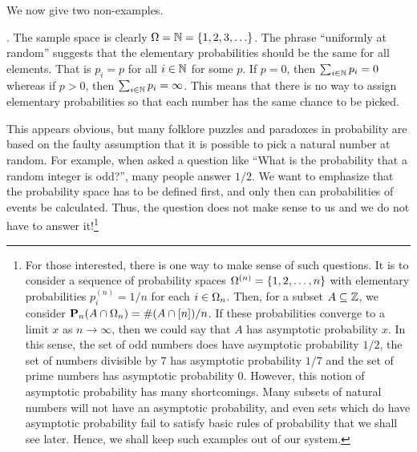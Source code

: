 \documentclass[preprint,  11pt]{amsart}
\begin{document}
We now give two non-examples.
\begin{example}. The sample space is clearly $\Omega=\mathbb{N}=\{1,2,3,\ldots\}$. The phrase ``uniformly at random'' suggests that the elementary probabilities should be the same for all elements. That is $p_{i}=p$ for all $i\in \mathbb{N}$ for some $p$. If $p=0$, then $\sum_{i\in \mathbb{N}}p_{i}=0$ whereas if $p>0$, then $\sum_{i\in \mathbb{N}}p_{i}=\infty$. This means that there is no way to assign elementary probabilities so that each number has the same chance to be picked.

This appears obvious, but many folklore puzzles and paradoxes in probability are based on the faulty assumption that it is possible to pick a natural number at random. For example, when asked a question like ``What is the probability that a random integer is odd?'', many people answer $1/2$. We want to emphasize that the probability space has to be defined first, and only then can probabilities of events be calculated. Thus, the question does not make sense to us and we do not have to answer it!\footnote{For those interested, there is one way to make sense of such questions. It is to consider a sequence of probability spaces $\Omega^{(n)}=\{1,2,\ldots ,n\}$ with elementary probabilities $p^{(n)}_{i}=1/n$ for each $i\in \Omega_{n}$. Then, for a subset $A\subseteq \mathbb{Z}$, we consider $\mathbf{P}_{n}(A\cap \Omega_{n})=\#(A\cap [n])/n$. If these probabilities converge to a limit $x$ as $n\to \infty$, then we could say that $A$ has asymptotic probability $x$. In this sense, the set of odd numbers does have  asymptotic probability $1/2$, the set of numbers divisible by $7$ has asymptotic probability $1/7$ and the set of prime numbers has asymptotic probability $0$. However, this notion of asymptotic probability has many shortcomings. Many subsets of natural numbers will not have an asymptotic probability, and even sets which do have asymptotic probability fail to satisfy basic rules of probability that we shall see later. Hence, we shall keep such examples out of our system.} 
\end{example}
\end{document}
